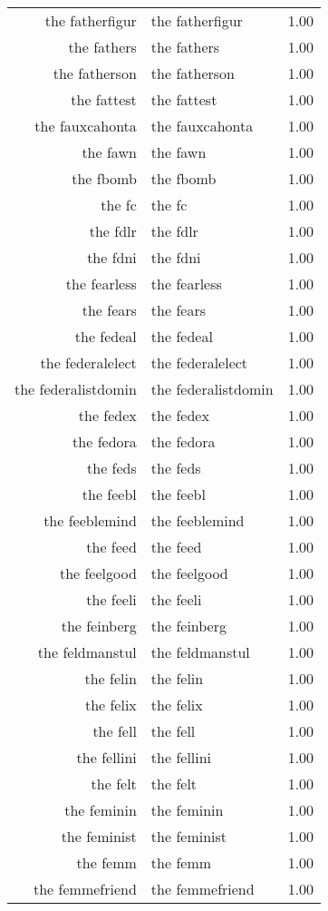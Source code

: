 \begin{table}[ht]
\begin{tabular}{rlr}
  the fatherfigur & the fatherfigur & 1.00 \\ 
  the fathers & the fathers & 1.00 \\ 
  the fatherson & the fatherson & 1.00 \\ 
  the fattest & the fattest & 1.00 \\ 
  the fauxcahonta & the fauxcahonta & 1.00 \\ 
  the fawn & the fawn & 1.00 \\ 
  the fbomb & the fbomb & 1.00 \\ 
  the fc & the fc & 1.00 \\ 
  the fdlr & the fdlr & 1.00 \\ 
  the fdni & the fdni & 1.00 \\ 
  the fearless & the fearless & 1.00 \\ 
  the fears & the fears & 1.00 \\ 
  the fedeal & the fedeal & 1.00 \\ 
  the federalelect & the federalelect & 1.00 \\ 
  the federalistdomin & the federalistdomin & 1.00 \\ 
  the fedex & the fedex & 1.00 \\ 
  the fedora & the fedora & 1.00 \\ 
  the feds & the feds & 1.00 \\ 
  the feebl & the feebl & 1.00 \\ 
  the feeblemind & the feeblemind & 1.00 \\ 
  the feed & the feed & 1.00 \\ 
  the feelgood & the feelgood & 1.00 \\ 
  the feeli & the feeli & 1.00 \\ 
  the feinberg & the feinberg & 1.00 \\ 
  the feldmanstul & the feldmanstul & 1.00 \\ 
  the felin & the felin & 1.00 \\ 
  the felix & the felix & 1.00 \\ 
  the fell & the fell & 1.00 \\ 
  the fellini & the fellini & 1.00 \\ 
  the felt & the felt & 1.00 \\ 
  the feminin & the feminin & 1.00 \\ 
  the feminist & the feminist & 1.00 \\ 
  the femm & the femm & 1.00 \\ 
  the femmefriend & the femmefriend & 1.00 \\ 

\end{tabular}
\end{table}
